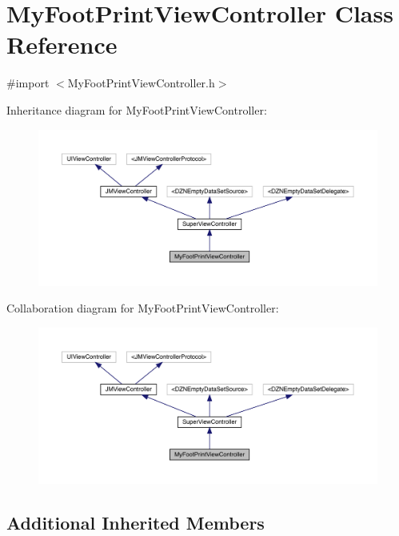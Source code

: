 \hypertarget{interface_my_foot_print_view_controller}{}\section{My\+Foot\+Print\+View\+Controller Class Reference}
\label{interface_my_foot_print_view_controller}


{\ttfamily \#import $<$My\+Foot\+Print\+View\+Controller.\+h$>$}



Inheritance diagram for My\+Foot\+Print\+View\+Controller\+:\nopagebreak
\begin{figure}[H]
\begin{center}
\leavevmode
\includegraphics[width=350pt]{interface_my_foot_print_view_controller__inherit__graph}
\end{center}
\end{figure}


Collaboration diagram for My\+Foot\+Print\+View\+Controller\+:\nopagebreak
\begin{figure}[H]
\begin{center}
\leavevmode
\includegraphics[width=350pt]{interface_my_foot_print_view_controller__coll__graph}
\end{center}
\end{figure}
\subsection*{Additional Inherited Members}


